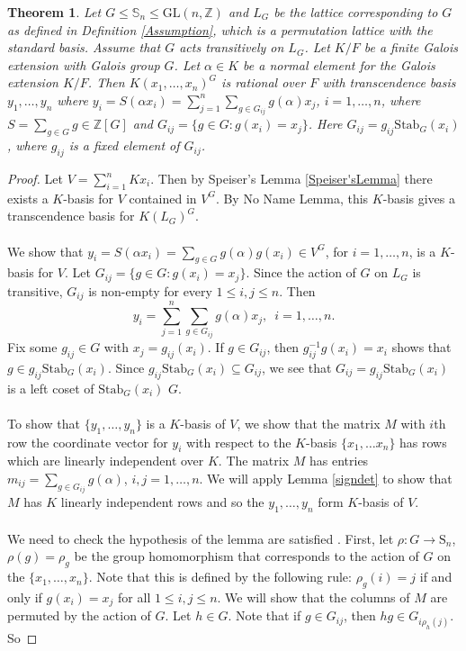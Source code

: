 \documentclass[12pt]{article}
\theoremstyle{plain}
\newtheorem{theorem}{Theorem}
\newcommand{\Z}{\ensuremath{\mathbb{Z}}}
\begin{document}
\begin{theorem}
Let $G\leq \mathbb{S}_n \leq \mathrm{GL}(n,\Z)$ and $L_G$ be the lattice corresponding to $G$ as defined in Definition \ref{Assumption}, which is a permutation lattice with the standard basis. Assume that $G$ acts transitively on $L_G$. Let $K/F$ be a finite Galois extension with Galois group $G$. Let $\alpha \in K$ be a normal element for the Galois extension $K/F$. Then $ K(x_1,\ldots , x_n)^G$ is rational over $F$ with transcendence basis $y_1, \ldots , y_n$ where $y_i = S(\alpha x_i) = \sum^n_{j=1}\sum_{g \in G_{ij}}g(\alpha)x_j$, $i = 1, \ldots , n$, where $S = \sum_{g\in G} g \in \Z[G]$ and $G_{ij} = \lbrace g \in G : g(x_i) = x_j \rbrace$. Here $G_{ij}=g_{ij}\mathrm{Stab}_{G}(x_i)$, where $g_{ij}$ is a fixed element of $G_{ij}$. 
\end{theorem}
\begin{proof}
Let $V = \sum_{i=1}^n Kx_i$. Then by Speiser's Lemma \ref{Speiser'sLemma} there exists a $K$-basis for $V$ contained in $V^G$. By No Name Lemma, this $K$-basis gives a transcendence basis for $K(L_G)^G$.\\
\\
We show that $y_i = S(\alpha x_i) = \sum_{g \in G} g(\alpha)g(x_i) \in V^G$, for $i = 1, \ldots , n$, is a $K$-basis for $V$. Let $G_{ij}= \lbrace g \in G: g(x_i) = x_j \rbrace$. Since the action of $G$ on $L_G$ is transitive, $G_{ij}$ is non-empty for every $1 \leq i,j \leq n$. Then $$y_i = \sum^n_{j =1}\sum_{g \in G_{ij}}g(\alpha)x_j, \,\,\, i = 1, \ldots, n.$$
Fix some $g_{ij} \in G$ with $x_j = g_{ij}(x_i)$. If $g \in G_{ij}$, then $g^{-1}_{ij}g(x_i) = x_i$ shows that $g \in g_{ij}\mathrm{Stab}_G(x_i)$. Since  $g_{ij}\mathrm{Stab}_G(x_i) \subseteq G_{ij}$, we see that $G_{ij} = g_{ij}\mathrm{Stab}_G(x_i)$ is a left coset of $\mathrm{Stab}_G(x_i)$ $G$.\\
\\
To show that $\lbrace y_1, \ldots, y_n \rbrace$ is a $K$-basis of $V$, we show that the matrix $M$ with $i$th row the coordinate vector for $y_i$ with respect to the $K$-basis $\lbrace x_1, \ldots x_n \rbrace$ has rows which are linearly independent over $K$. The matrix $M$ has entries $m_{ij} = \sum_{g \in G_{ij}}g(\alpha)$, $i,j = 1, \ldots, n$. We will apply Lemma \ref{signdet} to show that $M$ has $K$ linearly independent  rows and so the $y_1, \ldots, y_n$ form $K$-basis of $V$.\\
\\
We need to check the hypothesis of the lemma are satisfied . First, let $\rho: G \longrightarrow \mathrm{S}_n$, $\rho(g) = \rho_g$ be the group homomorphism that corresponds to the action of $G$ on the $\lbrace x_1, \ldots , x_n \rbrace$. Note that this is defined by the following rule: $\rho_g(i) = j$ if and only if $g(x_i) = x_j$ for all $1 \leq i,j\leq n$. We will show that the columns of $M$ are permuted by the action of $G$. Let $h \in G$. Note that if $g \in G_{ij}$, then $hg \in G_{i\rho_h(j)}$. So 

\end{proof}
\end{document}
